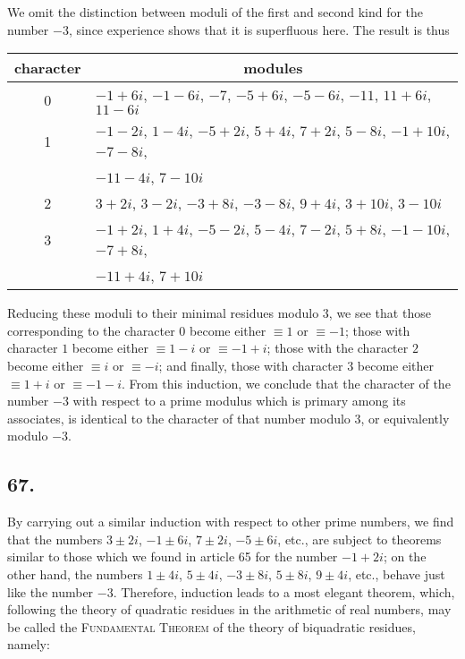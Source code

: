 \documentclass[twoside,12pt]{memoir}
\begin{document}
We omit the distinction between moduli of the first and second kind for the number \(-3\), since experience shows that it is superfluous here. The result is thus\pagebreak%
\begin{center}
\begin{tabular}{c|l}
character & \multicolumn{1}{c}{modules} \\
\hline
0 & \(-1+6 i\), \(-1-6 i\), \(-7\), \(-5+6 i\), \(-5-6 i\), \(-11\), \(11+6 i\), \(11-6 i\) \\
1 & \(-1-2 i\), \(1-4 i\), \(-5+2 i\), \(5+4 i\), \(7+2 i\), \(5-8 i\), \(-1+10 i\), \(-7-8 i\),  \\
 & \quad \(-11-4 i\), \(7-10 i\) \\
2 & \(3+2 i\), \(3-2 i\), \(-3+8 i\), \(-3-8 i\), \(9+4 i\), \(3+10 i\), \(3-10 i\) \\
3 & \(-1+2 i\), \(1+4 i\), \(-5-2 i\), \(5-4 i\), \(7-2 i\), \(5+8 i\), \(-1-10 i\), \(-7+8 i\), \\
 & \quad \(-11+4 i\), \(7+10 i\) \\
\end{tabular}
\end{center}

Reducing these moduli to their minimal residues modulo \(3\), we see that those corresponding to the character \(0\) become either \(\equiv 1\) or \(\equiv -1\); those with character \(1\) become either \(\equiv 1-i\) or \(\equiv -1+i\); those with the character \(2\) become either \(\equiv i\) or \(\equiv -i\); and finally, those with character \(3\) become either \(\equiv 1+i\) or \(\equiv -1-i\). From this induction, we conclude that the character of the number \(-3\) with respect to a prime modulus which is primary among its associates, is identical to the character of that number modulo \(3\), or equivalently modulo \(-3\).

\subsection*{67.}

By carrying out a similar induction with respect to other prime numbers, we find that the numbers \(3 \pm 2i\), \(-1 \pm 6i\), \(7 \pm 2i\), \(-5 \pm 6i\), etc{.}, are subject to theorems similar to those which we found in article 65 for the number \(-1+2i\); on the other hand, the numbers \(1 \pm 4i\), \(5 \pm 4i\), \(-3 \pm 8i\), \(5 \pm 8i\), \(9 \pm 4i\), etc{.}, behave just like the number \(-3\). Therefore, induction leads to a most elegant theorem, which, following the theory of quadratic residues in the arithmetic of real numbers, may be called the \textsc{Fundamental Theorem} of the theory of biquadratic residues, namely:
\end{document}
